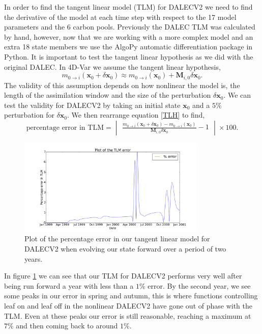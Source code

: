 \documentclass[11pt]{article}
\begin{document}
In order to find the tangent linear model (TLM) for DALECV2 we need to find the derivative of the model at each time step with respect to the 17 model parameters and the 6 carbon pools. Previously the DALEC TLM was calculated by hand, however, now that we are working with a more complex model and an extra 18 state members we use the AlgoPy automatic differentiation package in Python. It is important to test the tangent linear hypothesis as we did with the original DALEC. In 4D-Var we assume the tangent linear hypothesis,
\begin{equation}
m_{0\rightarrow i}(\mathbf{x}_0+\delta\mathbf{x}_0) \approx m_{0 \rightarrow i}(\mathbf{x}_0) + \mathbf{M}_{i,0}\delta\mathbf{x}_0. \label{TLH}
\end{equation}
The validity of this assumption depends on how nonlinear the model is, the length of the assimilation window and the size of the perturbation $\delta\mathbf{x}_0$. We can test the validity for DALECV2 by taking an initial state $\mathbf{x}_0$ and a $5\%$ perturbation for $\delta\mathbf{x}_0$. We then rearrange equation \ref{TLH} to find, 
\begin{equation}
\text{percentage error in TLM} = \begin{vmatrix} \frac{m_{0\rightarrow i}(\mathbf{x}_0+\delta\mathbf{x}_0) - m_{0 \rightarrow i}(\mathbf{x}_0)}{ \mathbf{M}_{i,0}\delta\mathbf{x}_0} - 1 \end{vmatrix} \times 100.
\end{equation}

\begin{figure}[ht]
    \centering
    \includegraphics[width=0.8\textwidth]{tlm_error.png}
    \caption{Plot of the percentage error in our tangent linear model for DALECV2 when evolving our state forward over a period of two years.}
    \label{fig:tlm_error}
\end{figure}

In figure \ref{fig:tlm_error} we can see that our TLM for DALECV2 performs very well after being run forward a year with less than a $1\%$ error. By the second year, we see some peaks in our error in spring and autumn, this is where functions controlling leaf on and leaf off in the nonlinear DALECV2 have gone out of phase with the TLM. Even at these peaks our error is still reasonable, reaching a maximum at $7\%$ and then coming back to around $1\%$. 
\end{document}
